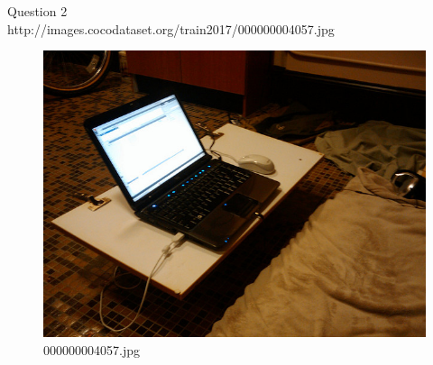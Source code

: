 Question 2\\
http://images.cocodataset.org/train2017/000000004057.jpg
    \begin{figure}[h]
        \centering
        \includegraphics[width=0.8\linewidth]{../image set/easy/000000004057.jpg}
        \caption{000000004057.jpg}
    \end{figure}
